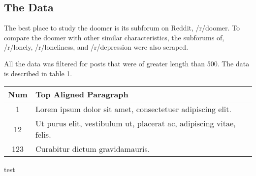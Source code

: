 \documentclass[../report.tex]{subfiles}
\begin{document}
\subsection{The Data}
The best place to study the doomer is its subforum on Reddit, /r/doomer. To compare the doomer with other similar characteristics, the subforums of, /r/lonely, /r/loneliness, and /r/depression were also scraped.

All the data was filtered for posts that were of greater length than 500. The data is described in table 1. 


\begin{center}
\begin{tabular}{|c|p{6cm}|}
    \hline
    Num & Top Aligned Paragraph\\
    \hline
    1 & Lorem ipsum dolor sit amet, consectetuer adipiscing elit. \\
    \hline
    12 & Ut purus elit, vestibulum ut, placerat ac, adipiscing vitae, felis. \\
    \hline
    123 & Curabitur dictum gravidamauris. \\
    \hline

\end{tabular}

\caption{test}
\end{center}
\end{document}
